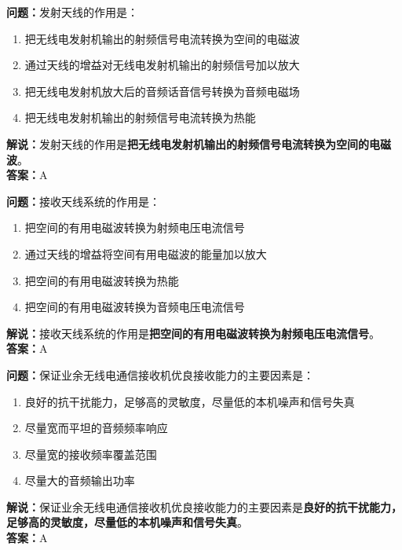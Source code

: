 \textbf{问题：}发射天线的作用是：

\begin{enumerate}[label=\Alph*), leftmargin=1cm]
	\item 把无线电发射机输出的射频信号电流转换为空间的电磁波
	\item 通过天线的增益对无线电发射机输出的射频信号加以放大
	\item 把无线电发射机放大后的音频话音信号转换为音频电磁场
	\item 把无线电发射机输出的射频信号电流转换为热能
\end{enumerate}

\textbf{解说：}发射天线的作用是\textbf{把无线电发射机输出的射频信号电流转换为空间的电磁波}。\\\textbf{答案：}A%



\textbf{问题：}接收天线系统的作用是：

\begin{enumerate}[label=\Alph*), leftmargin=1cm]
	\item 把空间的有用电磁波转换为射频电压电流信号
	\item 通过天线的增益将空间有用电磁波的能量加以放大
	\item 把空间的有用电磁波转换为热能
	\item 把空间的有用电磁波转换为音频电压电流信号
\end{enumerate}

\textbf{解说：}接收天线系统的作用是\textbf{把空间的有用电磁波转换为射频电压电流信号}。\\\textbf{答案：}A%



\textbf{问题：}保证业余无线电通信接收机优良接收能力的主要因素是：

\begin{enumerate}[label=\Alph*), leftmargin=1cm]
	\item 良好的抗干扰能力，足够高的灵敏度，尽量低的本机噪声和信号失真
	\item 尽量宽而平坦的音频频率响应
	\item 尽量宽的接收频率覆盖范围
	\item 尽量大的音频输出功率
\end{enumerate}

\textbf{解说：}保证业余无线电通信接收机优良接收能力的主要因素是\textbf{良好的抗干扰能力，足够高的灵敏度，尽量低的本机噪声和信号失真}。\\\textbf{答案：}A%



